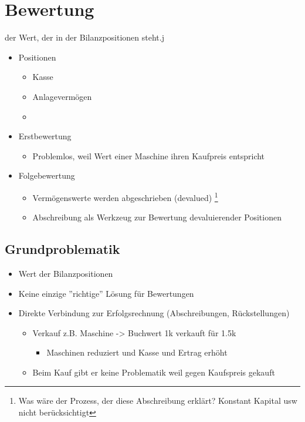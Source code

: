 
\section{Bewertung}

\begin{definition}
    [Bewertung] der Wert, der in der Bilanzpositionen steht.j
\end{definition}
\begin{itemize}
    \item Positionen
    \begin{itemize}
        \item Kasse
    \item Anlagevermögen
    \item 
\end{itemize}
\item Erstbewertung
\begin{itemize}
    \item Problemlos, weil Wert einer Maschine ihren Kaufpreis entspricht
\end{itemize}
\item Folgebewertung
\begin{itemize}
    \item Vermögenswerte werden abgeschrieben (devalued) \footnote{Was wäre der Prozess, der diese Abschreibung erklärt? Konstant Kapital usw nicht berücksichtigt }
    \item Abschreibung als Werkzeug zur Bewertung devaluierender Positionen 
\end{itemize}
\end{itemize}
\subsection{Grundproblematik}
\begin{itemize}
    \item Wert der Bilanzpositionen
    \item Keine einzige ''richtige'' Lösung für Bewertungen
    \item Direkte Verbindung zur Erfolgsrechnung (Abschreibungen, Rückstellungen)
    \begin{itemize}
        \item Verkauf z.B. Maschine -> Buchwert 1k verkauft für 1.5k
        \begin{itemize}
            \item Maschinen reduziert und Kasse und Ertrag erhöht
        \end{itemize}
        \item Beim Kauf gibt er keine Problematik weil gegen Kaufspreis gekauft 
        
    \end{itemize}
\end{itemize}

